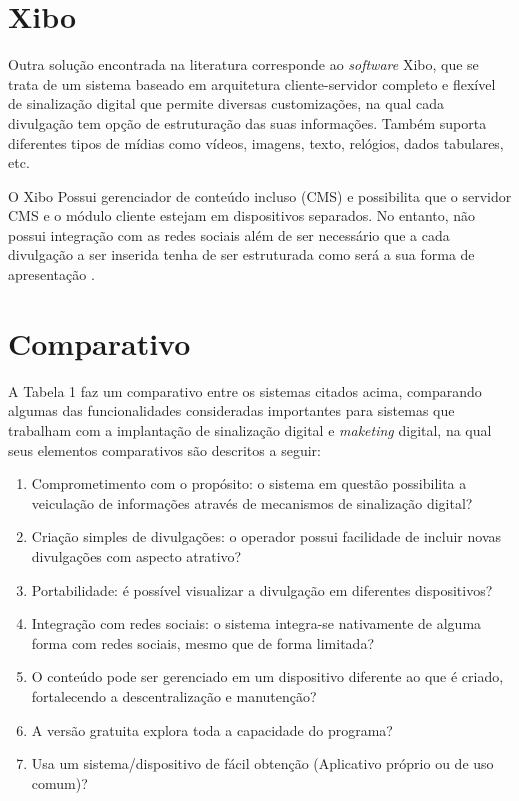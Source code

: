 \section{Xibo}
Outra solução encontrada na literatura corresponde ao \textit{software} Xibo, que se trata de um sistema baseado em arquitetura cliente-servidor completo e flexível de sinalização digital que permite diversas customizações, na qual cada divulgação tem opção de estruturação das suas informações. Também suporta diferentes tipos de mídias como vídeos, imagens, texto, relógios, dados tabulares, etc. 

O Xibo Possui gerenciador de conteúdo incluso (CMS) e possibilita que o servidor CMS e o módulo cliente estejam em dispositivos separados. No entanto, não possui integração com as redes sociais além de ser necessário que a cada divulgação a ser inserida tenha de ser estruturada como será a sua forma de apresentação \cite{xibo2017}.

\section{Comparativo}
A Tabela 1 faz um comparativo entre os sistemas citados acima, comparando algumas das funcionalidades consideradas importantes para sistemas que trabalham com a implantação de sinalização digital e \textit{maketing} digital, na qual seus elementos comparativos são descritos a seguir:
\begin{enumerate}[label=\Roman*)]
	\item Comprometimento com o propósito: o sistema em questão possibilita a veiculação de informações através de mecanismos de sinalização digital?
	\item Criação simples de divulgações: o operador possui facilidade de incluir novas divulgações com aspecto atrativo?
	\item Portabilidade: é possível visualizar a divulgação em diferentes dispositivos?
	\item Integração com redes sociais: o sistema integra-se nativamente de alguma forma com redes sociais, mesmo que de forma limitada?
	\item O conteúdo pode ser gerenciado em um dispositivo diferente ao que é criado, fortalecendo a descentralização e manutenção?
	\item A versão gratuita explora toda a capacidade do programa?
	\item Usa um sistema/dispositivo de fácil obtenção (Aplicativo próprio ou de uso comum)?
\end{enumerate}

